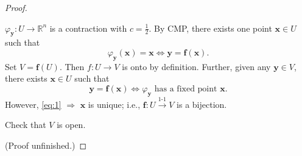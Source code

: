 \documentclass[letterpaper, reqno,11pt]{article}
\newcommand{\RR}{\mathbb{R}}
\begin{document}
\begin{proof}
\begin{enumerate}
     $\varphi_{\mathbf y} : U \to \RR^n$ is a contraction with $c = \frac{1}{2}$. By CMP, there exists  one point $\mathbf x \in U$ such that
    \begin{equation} \label{eq:1}
      \varphi_{\mathbf y}(\mathbf x) = \mathbf x \Leftrightarrow \mathbf y = \mathbf f(\mathbf x).
    \end{equation}
    Set $V = \mathbf f(U)$. Then $f : U \to V$ is onto by definition. Further, given any $\mathbf y \in V$, there exists $\mathbf x \in U$ such that
    \[ \mathbf y = \mathbf f(\mathbf x) \Leftrightarrow \text{$\varphi_{\mathbf y}$ has a fixed point $\mathbf x$}. \]
    However, \eqref{eq:1} $\Rightarrow$ $\mathbf x$ is unique; i.e., $\mathbf f : U \xrightarrow{\text{$1$-$1$}} V$ is a bijection.

     Check that $V$ is open.
  \end{enumerate}

  (Proof unfinished.)
\end{proof}
\end{document}
